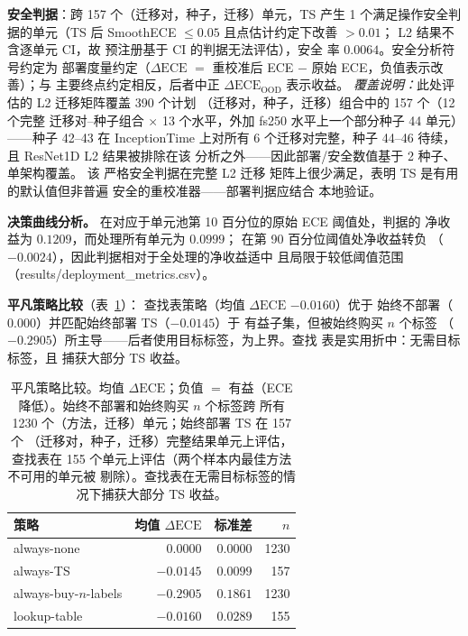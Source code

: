 \textbf{安全判据}：跨 157 个（迁移对，种子，迁移）单元，TS
产生 1 个满足操作安全判据的单元（TS 后
SmoothECE $\leq 0.05$ 且点估计约定下改善 $>0.01$；
L2 结果不含逐单元 CI，故
预注册基于 CI 的判据无法评估），安全
率 $0.0064$。安全分析符号约定为
部署度量约定（$\Delta\text{ECE}$ $=$ 重校准后 ECE $-$
原始 ECE，负值表示改善）；与
主要终点约定相反，后者中正
$\Delta\text{ECE}_{\text{OOD}}$ 表示收益。
\emph{覆盖说明：}此处评估的 L2 迁移矩阵覆盖 390 个计划
（迁移对，种子，迁移）组合中的 157 个（12 个完整
迁移对--种子组合 $\times$ 13 个水平，外加 fs250 水平上一个部分种子 44
单元）——种子 42--43 在
InceptionTime 上对所有 6 个迁移对完整，种子 44--46 待续，
且 ResNet1D L2 结果被排除在该
分析之外——因此部署/安全数值基于 2 种子、
单架构覆盖。
该
严格安全判据在完整 L2 迁移
矩阵上很少满足，表明 TS 是有用的默认值但非普遍
安全的重校准器——部署判据应结合
本地验证。

\textbf{决策曲线分析。} 在对应于单元池第 10 百分位的原始 ECE 阈值处，判据的
净收益为 $0.1209$，而处理所有单元为 $0.0999$；
在第 90 百分位阈值处净收益转负
（$-0.0024$），因此判据相对于全处理的净收益适中
且局限于较低阈值范围（results/deployment\_metrics.csv）。

\textbf{平凡策略比较}（表~\ref{tab:trivial}）：
查找表策略（均值 $\Delta\text{ECE}$ $-0.0160$）优于
始终不部署（$0.000$）并匹配始终部署 TS（$-0.0145$）于
有益子集，但被始终购买 $n$ 个标签
（$-0.2905$）所主导——后者使用目标标签，为上界。查找
表是实用折中：无需目标标签，且
捕获大部分 TS 收益。

\begin{table}[t]
\centering
\caption{平凡策略比较。均值 $\Delta\text{ECE}$；负值 $=$
有益（ECE 降低）。始终不部署和始终购买 $n$ 个标签跨
所有 1230 个（方法，迁移）单元；始终部署 TS 在 157 个
（迁移对，种子，迁移）完整结果单元上评估，查找表在
155 个单元上评估（两个样本内最佳方法不可用的单元被
剔除）。查找表在无需目标标签的情况下捕获大部分 TS 收益。}
\label{tab:trivial}
\begin{tabular}{lrrr}
\toprule
策略 & 均值 $\Delta\text{ECE}$ & 标准差 & $n$ \\
\midrule
always-none            & $\phantom{-}0.0000$  & $0.0000$ & 1230 \\
always-TS              & $-0.0145$            & $0.0099$ & 157  \\
always-buy-$n$-labels  & $-0.2905$            & $0.1861$ & 1230 \\
lookup-table           & $-0.0160$            & $0.0289$ & 155  \\
\bottomrule
\end{tabular}
\end{table}


